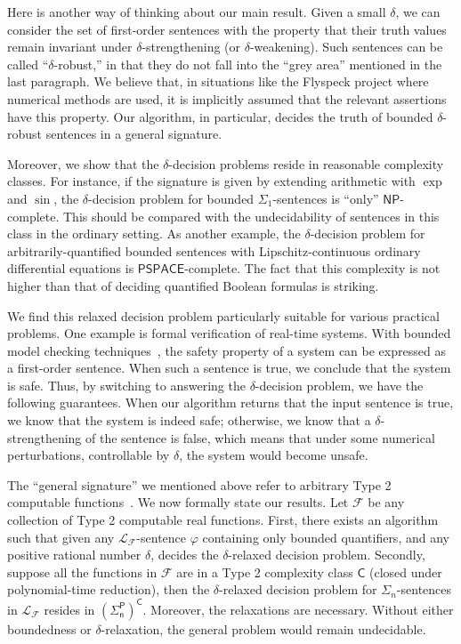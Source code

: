 \documentclass[prodmode]{acmsmall} %
\begin{document}
Here is another way of thinking about our main result. Given a small $\delta$, we can consider the set of first-order sentences with the property that their truth values remain invariant under $\delta$-strengthening (or $\delta$-weakening). Such sentences can be called ``$\delta$-robust,'' in that they do not fall into the ``grey area'' mentioned in the last paragraph. We believe that, in situations like the Flyspeck project where numerical methods are used, it is implicitly assumed that the relevant assertions have this property. Our algorithm, in particular, decides the truth of bounded $\delta$-robust sentences in a general signature. 

Moreover, we show that the $\delta$-decision problems reside in reasonable complexity classes. For instance, if the signature is given by extending arithmetic with $\exp$ and $\sin$, the $\delta$-decision problem for bounded $\Sigma_1$-sentences is ``only'' $\mathsf{NP}$-complete. This should be compared with the undecidability of sentences in this class in the ordinary setting. As another example, the $\delta$-decision problem for arbitrarily-quantified bounded sentences with Lipschitz-continuous ordinary differential equations is $\mathsf{PSPACE}$-complete. The fact that this complexity is not higher than that of deciding quantified Boolean formulas is striking. 

We find this relaxed decision problem particularly suitable for various practical problems. One example is formal verification of real-time systems. With bounded model checking techniques~\cite{DBLP:journals/fmsd/ClarkeBRZ01}, the safety property of a system can be expressed as a first-order sentence. When such a sentence is true, we conclude that the system is safe. Thus, by switching to answering the $\delta$-decision problem, we have the following guarantees. When our algorithm returns that the input sentence is true, we know that the system is indeed safe; otherwise, we know that a $\delta$-strengthening of the sentence is false, which means that under some numerical perturbations, controllable by $\delta$, the system would become unsafe. 

The ``general signature'' we mentioned above refer to arbitrary Type 2 computable functions~\cite{CAbook}. We now formally state our results. Let $\mathcal{F}$ be any collection of Type 2 computable real functions. First, there exists an algorithm such that given any $\mathcal{L}_{\mathcal{F}}$-sentence $\varphi$ containing only bounded quantifiers, and any positive rational number $\delta$, decides the $\delta$-relaxed decision problem. Secondly, suppose all the functions in $\mathcal{F}$ are in a Type 2 complexity class $\mathsf{C}$ (closed under polynomial-time reduction), then the $\delta$-relaxed decision problem for $\Sigma_n$-sentences in $\mathcal{L}_{\mathcal{F}}$ resides in $\mathsf{(\Sigma_n^P)^C}$. Moreover, the relaxations are necessary. Without either boundedness or $\delta$-relaxation, the general problem would remain undecidable. 
\end{document}
